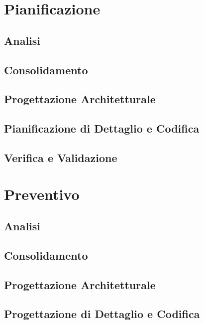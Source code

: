 \documentclass[a4paper, oneside, openany, dvipsnames, table]{article}
\begin{document}
\section{Pianificazione}
	\label{sec:Pian}
	
	\newpage	
	\subsection{Analisi}
		
	\newpage	
	\subsection{Consolidamento}
		
	\newpage
	\subsection{Progettazione Architetturale}
		
	\newpage
	\subsection{Pianificazione di Dettaglio e Codifica}
		
	\newpage
	\subsection{Verifica e Validazione}
		
\newpage
\section{Preventivo}
	
	\newpage
	\subsection{Analisi}
	    
	\newpage	
	\subsection{Consolidamento}
	    
	\newpage
	\subsection{Progettazione Architetturale}
	    
	\newpage
	\subsection{Progettazione di Dettaglio e Codifica}
	    
	\newpage
\end{document}
